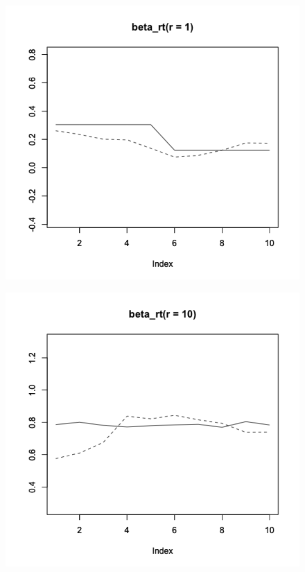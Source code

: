 \documentclass[a4paper,11pt,oneside,openany]{jsbook}
\begin{document}
\begin{figure}[]
 \begin{minipage}[b]{0.3\linewidth}
  \centering
  \includegraphics[keepaspectratio,scale=0.25]{img/beta_rt_1.png}
  \label{1}
 \end{minipage}
 \begin{minipage}[b]{0.3\linewidth}
  \centering
  \includegraphics[keepaspectratio,scale=0.25]{img/beta_rt_2.png}

\end{minipage}
\end{figure}
\end{document}
